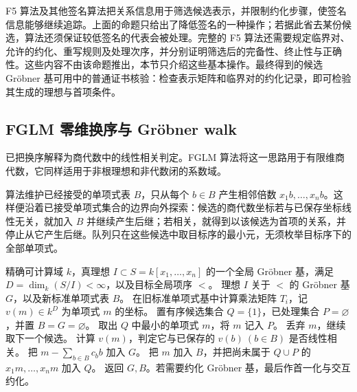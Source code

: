 F5 算法\cite{Faugere2002F5}及其他签名算法把关系信息用于筛选候选表示，并限制约化步骤，使签名信息能够继续追踪。上面的命题只给出了降低签名的一种操作；若据此省去某份候选，算法还须保证较低签名的代表会被处理。完整的 F5 算法还需要规定临界对、允许的约化、重写规则及处理次序，并分别证明筛选后的完备性、终止性与正确性。这些内容不由该命题推出，本节只介绍这些基本操作。最终得到的候选 Gröbner 基可用中的普通证书核验：检查表示矩阵和临界对的约化记录，即可检验其生成的理想与首项条件。

\subsection{FGLM 零维换序与 Gröbner walk}
\label{b3:subsec:B02:02}

已把换序解释为商代数中的线性相关判定。FGLM 算法将这一思路用于有限维商代数\cite{FaugereGianniLazardMora1993FGLM}，它同样适用于非根理想和非代数闭的系数域。

\ProseParagraphBreak
算法维护已经接受的单项式表 \(B\)，只从每个 \(b\in B\) 产生相邻倍数 \(x_1b,\ldots,x_nb\)。这样便沿着已接受单项式集合的边界向外探索：候选的商代数坐标若与已保存坐标线性无关，就加入 \(B\) 并继续产生后继；若相关，就得到以该候选为首项的关系，并停止从它产生后继。队列只在这些候选中取目标序的最小元，无须枚举目标序下的全部单项式。

\begin{algorithm}[htbp]
	\caption{FGLM 换序}\label{b3:alg:B-fglm}
	\begin{algorithmsteps}
		{精确可计算域 \(k\)，真理想 \(I\subset S=k[x_1,\ldots,x_n]\) 的一个全局 Gröbner 基，满足 \(D=\dim_k(S/I)<\infty\)，以及目标全局项序 \(<\)。}
		{理想 \(I\) 关于 \(<\) 的 Gröbner 基 \(G\)，以及新标准单项式表 \(B\)。}
		\State 在旧标准单项式基中计算乘法矩阵 \(T_i\)，记 \(v(m)\in k^D\) 为单项式 \(m\) 的坐标。
		\State 置有序候选集合 \(Q=\{1\}\)，已处理集合 \(P=\varnothing\)，并置 \(B=G=\varnothing\)。
			\State 取出 \(Q\) 中最小的单项式 \(m\)，将 \(m\) 记入 \(P\)。
				\State 丢弃 \(m\)，继续取下一个候选。
			\Else
				\State 计算 \(v(m)\)，判定它与已保存的 \(v(b)\ (b\in B)\) 是否线性相关。
					\State 把 \(m-\sum_{b\in B}c_bb\) 加入 \(G\)。
				\Else
					\State 把 \(m\) 加入 \(B\)，并把尚未属于 \(Q\cup P\) 的 \(x_1m,\ldots,x_nm\) 加入 \(Q\)。
				\EndIf
			\EndIf
		\EndWhile
		\State 返回 \(G,B\)。若需要约化 Gröbner 基，最后作首一化与交互约化。
	\end{algorithmsteps}
\end{algorithm}

